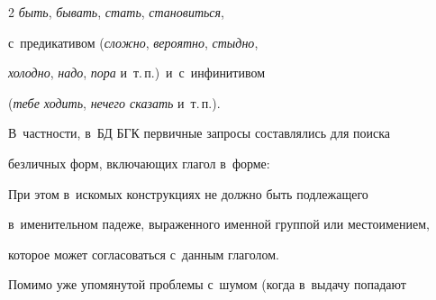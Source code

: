 \begin{multicols}{2}
\textit{быть}, \textit{бывать}, \textit{стать}, \textit{становиться}, 

с~предикативом (\textit{сложно}, \textit{вероятно}, \textit{стыдно}, 

\textit{холодно}, \textit{надо}, \textit{пора} и~т.\,п.)\ и~с~инфинитивом 

(\textit{тебе ходить}, \textit{нечего сказать} и~т.\,п.).

  

  В~частности, в~БД БГК первичные запросы составлялись для поиска 

безличных форм, вклю\-ча\-ющих глагол в~форме:


  

  При этом в~искомых конструкциях не должно быть подлежащего 

в~именительном падеже, выраженного именной группой или местоимением, 

которое может согласоваться с~данным глаголом.

  

  Помимо уже упомянутой проблемы с~шумом (когда в~выдачу попадают 


\end{multicols}
